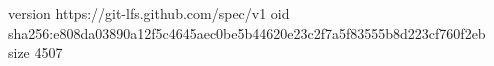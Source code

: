 version https://git-lfs.github.com/spec/v1
oid sha256:e808da03890a12f5c4645aec0be5b44620e23c2f7a5f83555b8d223cf760f2eb
size 4507
